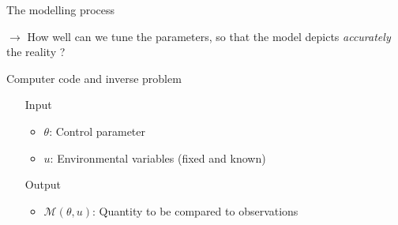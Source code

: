 \documentclass[10pt,aspectratio=169,usepdftitle=false]{beamer}
\newcommand\manupath{/home/victor/acadwriting/Manuscrit/Text/}
\newcommand{\kk}{\theta}
\newcommand{\uu}{u}
\begin{document}
\begin{frame}{The modelling process}
  \begin{center}
    \begin{adjustbox}{clip,
        trim=33cm 0cm 0cm 0cm,
        max width=0.9\textwidth, center}
    
    \end{adjustbox}
  \end{center}

  $\rightarrow$ How well can we tune the parameters, so that the model depicts \emph{accurately} the reality ?
\end{frame}



\AtBeginSection{
  \frame{
    \sectionpage
    \tableofcontents[currentsection,currentsubsection]%
  }
}

\begin{frame}[t]{Computer code and inverse problem}
  \begin{itemize}
  \item[Input]
    \begin{itemize}
    \item $\kk$: Control
      parameter%
    \item $\uu$: Environmental variables (fixed and known)
    \end{itemize}
  \item[Output] \begin{itemize}
    \item $\mathcal{M}(\kk,\uu)$: Quantity to be compared to
      observations%
    \end{itemize}
  \end{itemize}
  \vfill
   
\end{frame}
\end{document}
